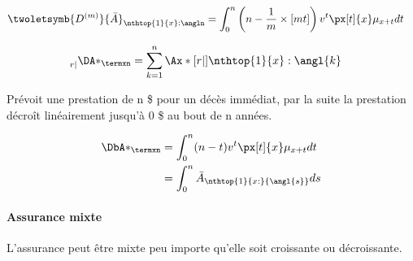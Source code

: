 \documentclass[10pt, french]{article}
\begin{document}
\begin{multicols*}{3}
\begin{definitionNOHFILLprop}
\begin{align*}
	\twoletsymb{D^{(m)}}{\bar{A}}_{\nthtop{1}{x}:\angln} 
	&=	\int_0^n \left(n - \frac{1}{m} \times [m t] \right) v^t \px[t]{x} \mu_{x + t} dt 
\end{align*}
\end{definitionNOHFILLprop}


\begin{definitionNOHFILLprop}
\begin{align*}
	\prescript{}{r|}{\DA*_{\termxn}} 
	&=	\sum_{k = 1}^{n} \Ax*[r|]{\nthtop{1}{x}:\angl{k}} 
\end{align*}
\end{definitionNOHFILLprop}


\begin{definitionNOHFILLprop}
Prévoit une prestation de n \$ pour un décès immédiat, par la suite la prestation décroît linéairement jusqu'à 0 \$ au bout de n années.

\begin{align*}
	\DbA*_{\termxn} 
	&=	\int_0^{n} (n - t) v^t \px[t]{x} \mu_{x + t} dt \\
	&=	\int_0^{n} \bar{A}_{\nthtop{1}{x:}{\angl{s}}} ds
\end{align*}
\end{definitionNOHFILLprop}



\paragraph{Assurance mixte}
L'assurance peut être mixte peu importe qu'elle soit croissante ou décroissante.


\end{multicols*}
\end{document}
